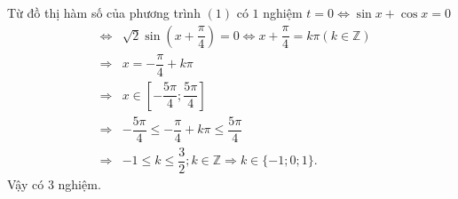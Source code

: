 \begin{ex} 
{			Từ đồ thị hàm số của phương trình $(1)$ có $1$ nghiệm $ t=0\Leftrightarrow \sin x+\cos x=0$
			\allowdisplaybreaks
			\begin{eqnarray*}
				&\Leftrightarrow &\sqrt{2}\sin (x+\dfrac{\pi }{4})=0\Leftrightarrow x+\dfrac{\pi }{4}=k\pi(k\in \mathbb{Z})\\
				&\Rightarrow & x=-\dfrac{\pi }{4}+k\pi \\
				&\Rightarrow & x\in \left[ -\dfrac{5\pi }{4};\dfrac{5\pi }{4} \right]\\
				&\Rightarrow & -\dfrac{5\pi }{4}\le -\dfrac{\pi }{4}+k\pi \le \dfrac{5\pi }{4}\\
				&\Rightarrow & -1\le k\le \dfrac{3}{2};k\in \mathbb{Z}\Rightarrow k\in \{-1;0;1\}.
			\end{eqnarray*}
			Vậy có 3 nghiệm.
		}
	\end{ex}
